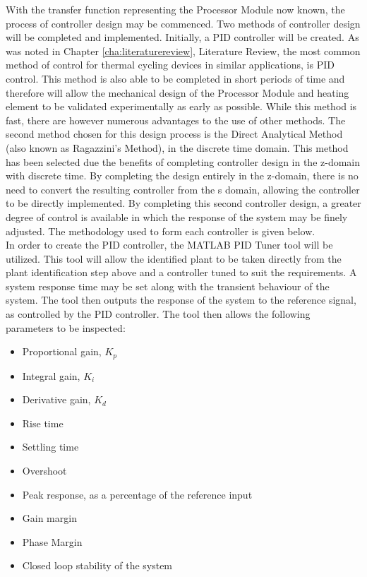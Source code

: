 With the transfer function representing the Processor Module now known, the process of controller design may be commenced. Two methods of controller design will be completed and implemented. Initially, a PID controller will be created. As was noted in Chapter \ref{cha:literaturereview}, Literature Review, the most common method of control for thermal cycling devices in similar applications, is PID control. This method is also able to be completed in short periods of time and therefore will allow the mechanical design of the Processor Module and heating element to be validated experimentally as early as possible. While this method is fast, there are however numerous advantages to the use of other methods. The second method chosen for this design process is the Direct Analytical Method (also known as Ragazzini's Method), in the discrete time domain.  This method has been selected due the benefits of completing controller design in the z-domain with discrete time. By completing the design entirely in the z-domain, there is no need to convert the resulting controller from the s domain, allowing the controller to be directly implemented. By completing this second controller design, a greater degree of control is available in which the response of the system may be finely adjusted. The methodology used to form each controller is given below.\\

In order to create the PID controller, the MATLAB PID Tuner tool will be utilized. This tool will allow the identified plant to be taken directly from the plant identification step above and a controller tuned to suit the requirements. A system response time may be set along with the transient behaviour of the system. The tool then outputs the response of the system to the reference signal, as controlled by the PID controller. The tool then allows the following parameters to be inspected:
\begin{itemize}
	\item Proportional gain, $K_p$
	\item Integral gain, $K_i$
	\item Derivative gain, $K_d$
	\item Rise time
	\item Settling time
	\item Overshoot
	\item Peak response, as a percentage of the reference input
	\item Gain margin
	\item Phase Margin
	\item Closed loop stability of the system
\end{itemize}

